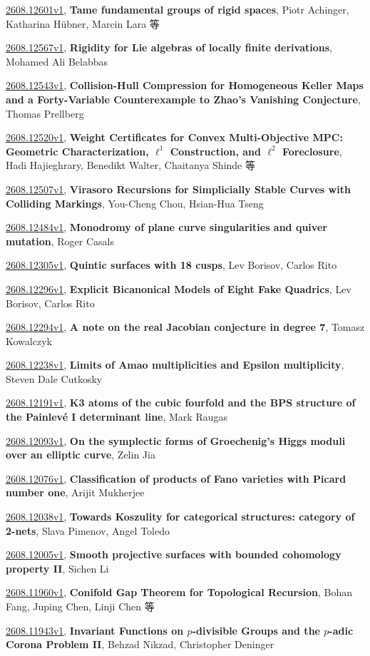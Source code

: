 \documentclass[9pt, a4paper]{article}
\theoremstyle{plain}
\theoremstyle{definition}
\theoremstyle{remark}
\newcommand{\arxiv}[3]{\href{https://arxiv.org/abs/#1}{#1}, \textbf{\textcolor{arxivblue}{#2}}, #3}
\begin{document}
\arxiv{2608.12601v1}{Tame fundamental groups of rigid spaces}{Piotr Achinger, Katharina Hübner, Marcin Lara 等}

\arxiv{2608.12567v1}{Rigidity for Lie algebras of locally finite derivations}{Mohamed Ali Belabbas}

\arxiv{2608.12543v1}{Collision-Hull Compression for Homogeneous Keller Maps and a Forty-Variable Counterexample to Zhao's Vanishing Conjecture}{Thomas Prellberg}

\arxiv{2608.12520v1}{Weight Certificates for Convex Multi-Objective MPC: Geometric Characterization, $\ell^1$ Construction, and $\ell^2$ Foreclosure}{Hadi Hajieghrary, Benedikt Walter, Chaitanya Shinde 等}

\arxiv{2608.12507v1}{Virasoro Recursions for Simplicially Stable Curves with Colliding Markings}{You-Cheng Chou, Hsian-Hua Tseng}

\arxiv{2608.12484v1}{Monodromy of plane curve singularities and quiver mutation}{Roger Casals}

\arxiv{2608.12305v1}{Quintic surfaces with 18 cusps}{Lev Borisov, Carlos Rito}

\arxiv{2608.12296v1}{Explicit Bicanonical Models of Eight Fake Quadrics}{Lev Borisov, Carlos Rito}

\arxiv{2608.12294v1}{A note on the real Jacobian conjecture in degree 7}{Tomasz Kowalczyk}

\arxiv{2608.12238v1}{Limits of Amao multiplicities and Epsilon multiplicity}{Steven Dale Cutkosky}

\arxiv{2608.12191v1}{K3 atoms of the cubic fourfold and the BPS structure of the Painlevé I determinant line}{Mark Raugas}

\arxiv{2608.12093v1}{On the symplectic forms of Groechenig's Higgs moduli over an elliptic curve}{Zelin Jia}

\arxiv{2608.12076v1}{Classification of products of Fano varieties with Picard number one}{Arijit Mukherjee}

\arxiv{2608.12038v1}{Towards Koszulity for categorical structures: category of 2-nets}{Slava Pimenov, Angel Toledo}

\arxiv{2608.12005v1}{Smooth projective surfaces with bounded cohomology property II}{Sichen Li}

\arxiv{2608.11960v1}{Conifold Gap Theorem for Topological Recursion}{Bohan Fang, Juping Chen, Linji Chen 等}

\arxiv{2608.11943v1}{Invariant Functions on $p$-divisible Groups and the $p$-adic Corona Problem II}{Behzad Nikzad, Christopher Deninger}
\end{document}
